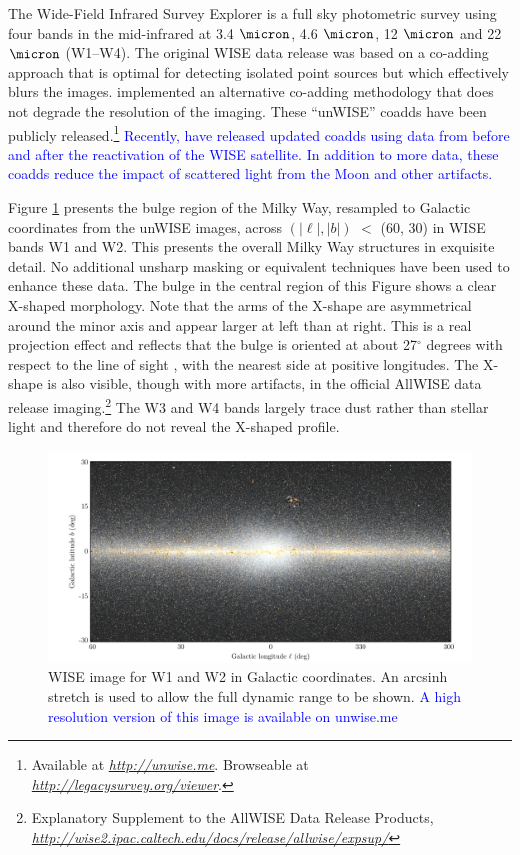 \documentclass[12pt, preprint]{aastex}
\newcommand{\niceurl}[1]{\href{#1}{\textsl{#1}}}
\newcommand{\viewerurl}{\niceurl{http://legacysurvey.org/viewer}}
\begin{document}
The Wide-Field Infrared Survey Explorer \citep[WISE;][]{W2010} is a full sky photometric survey using four bands in the mid-infrared at 3.4 $\micron$, 4.6 $\micron$, 12 $\micron$ and 22 $\micron$ (W1--W4). The original WISE data release was based on a co-adding approach that is optimal for detecting isolated point sources but which effectively blurs the images. \citet{Lang2014a} implemented an alternative co-adding methodology that does not degrade the resolution of the imaging.  These ``unWISE'' coadds have been publicly released.\footnote{Available at \niceurl{http://unwise.me}. Browseable at \viewerurl.}  \textcolor{blue}{Recently, \citet{Meisner2016} have released updated coadds using data from before and after the reactivation of the WISE satellite.  In addition to more data, these coadds reduce the impact of scattered light from the Moon and other artifacts.}

Figure \ref{fig:xbulge} presents the bulge region of the Milky Way,  resampled to Galactic coordinates from the unWISE images, across $(|\ell|,|b|)$ $<$ (60, 30) in WISE bands W1 and W2.  This presents the overall Milky Way structures in exquisite detail.
No additional unsharp masking or equivalent techniques have been used to enhance these data. The bulge in the central region of this Figure shows a clear X-shaped morphology. Note that the arms of the X-shape are asymmetrical around the minor axis and appear larger at left than at right. This is a real projection effect and reflects that the bulge is oriented at about 27$^\circ$ degrees with respect to the line of sight \citep{Wegg2013}, with the nearest side at positive longitudes. The X-shape is also visible, though with more artifacts, in the official AllWISE data release imaging.\footnote{Explanatory
  Supplement to the AllWISE Data Release Products, 
  \niceurl{http://wise2.ipac.caltech.edu/docs/release/allwise/expsup/}}
%
The W3 and W4 bands largely trace dust rather than stellar light and therefore
do not reveal the X-shaped profile.

\begin{figure}[h!]
\centering
        \includegraphics[width=\textwidth]{xbulge-00}
\caption{WISE image for W1 and W2 in Galactic coordinates.  An arcsinh
  stretch is used to allow the full dynamic range to be shown. \textcolor{blue}{A high resolution version of this image is available on unwise.me}}
\label{fig:xbulge}
\end{figure}
\end{document}
